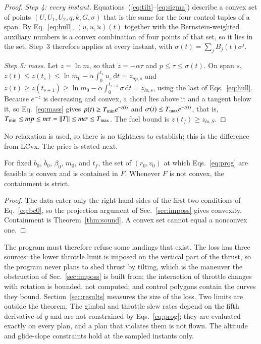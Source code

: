 \begin{proof}
\emph{Step 4: every instant.} Equations~(\ref{eq:tilt}--\ref{eq:sigma}) describe a convex set of points $(U,U_1,U_2,q,k,G,\sigma)$
that is the same for the four control tuples of a span. By Eq.~\eqref{eq:hull}, $(u,\dot u,\ddot u)(t)$ together with the
Bernstein-weighted auxiliary numbers is a convex combination of four points of that set, so it lies in the set. Step~3
therefore applies at every instant, with $\sigma(t)=\sum_jB_j(t)\sigma^j$.

\emph{Step 5: mass.} Let $z=\ln m$, so that $\dot z=-\alpha\tau$ and $p\le\tau\le\sigma(t)$. On span $s$,
$z(t)\le z(t_s)\le\ln m_0-\alpha\int_0^{t_s}u_z\,\mathrm dt=z_{up,s}$ and $z(t)\ge z(t_{s+1})\ge\ln m_0-\alpha\int_0^{t_{s+1}}\sigma\,\mathrm dt=z_{lo,s}$,
using the last of Eqs.~\eqref{eq:hull}. Because $e^{-z}$ is decreasing and convex, a chord lies above it and a tangent below it,
so Eq.~\eqref{eq:mass} gives $p(t)\ge T_{\min} e^{-z(t)}$ and $\sigma(t)\le T_{\max} e^{-z(t)}$, that is,
$T_{\min}\le mp\le m\tau=\lVert T\rVert\le m\sigma\le T_{\max}$. The fuel bound is $z(t_f)\ge z_{lo,S}$.
\end{proof}

No relaxation is used, so there is no tightness to establish; this is the difference from LCvx. The price is stated next.

\begin{proposition}\label{prop:inc}
For fixed $b_0$, $\dot b_0$, $\beta_0$, $m_0$, and $t_f$, the set of $(r_0,v_0)$ at which Eqs.~\eqref{eq:prog} are feasible is
convex and is contained in $F$. Whenever $F$ is not convex, the containment is strict.
\end{proposition}
\begin{proof}
The data enter only the right-hand sides of the first two conditions of Eq.~\eqref{eq:bc0}, so the projection argument of
Sec.~\ref{sec:imposs} gives convexity. Containment is Theorem~\ref{thm:sound}. A convex set cannot equal a nonconvex one.
\end{proof}

The program must therefore refuse some landings that exist. The loss has three sources: the lower throttle limit is imposed on
the vertical part of the thrust, so the program never plans to shed thrust by tilting, which is the maneuver the obstruction of
Sec.~\ref{sec:imposs} is built from; the interaction of throttle changes with rotation is bounded, not computed; and control
polygons contain the curves they bound. Section~\ref{sec:results} measures the size of the loss. Two limits are outside the
theorem. The gimbal and throttle slew rates depend on the fifth derivative of $y$ and are not constrained by
Eqs.~\eqref{eq:prog}; they are evaluated exactly on every plan, and a plan that violates them is not flown. The altitude and
glide-slope constraints hold at the sampled instants only.

